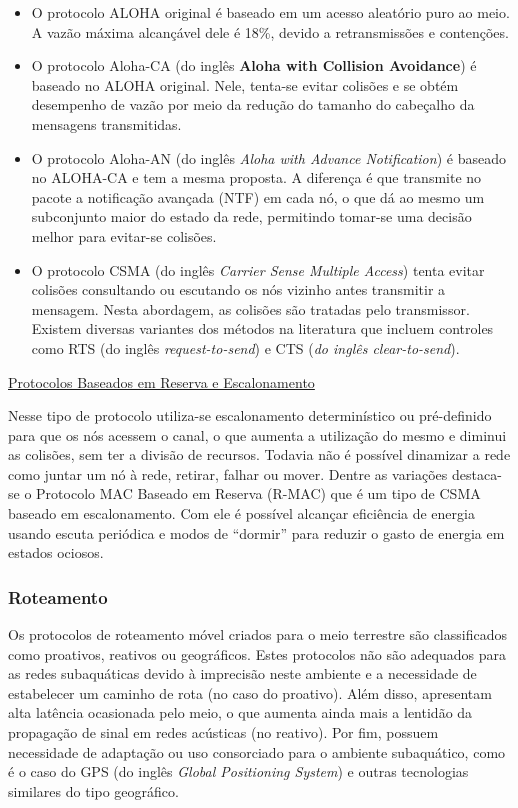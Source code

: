 \begin{itemize}
	\item O protocolo ALOHA original é baseado em um acesso aleatório puro ao meio. A vazão máxima alcançável dele é 18\%, devido a retransmissões e contenções.
	\item O protocolo Aloha-CA (do inglês \textbf{Aloha with Collision Avoidance}) é baseado no ALOHA original. Nele, tenta-se evitar colisões e se obtém desempenho de vazão por meio da redução do tamanho do cabeçalho da mensagens transmitidas.
	\item O protocolo Aloha-AN (do inglês \textit{Aloha with Advance Notification}) é baseado no ALOHA-CA e tem a mesma proposta. A diferença é que transmite no pacote a notificação avançada (NTF) em cada nó, o que dá ao mesmo um subconjunto maior do estado da rede, permitindo tomar-se uma decisão melhor para evitar-se colisões.
	\item O protocolo CSMA (do inglês \textit{Carrier Sense Multiple Access}) tenta evitar colisões consultando ou escutando os nós vizinho antes transmitir a mensagem. Nesta abordagem, as colisões são tratadas pelo transmissor. Existem diversas variantes dos métodos na literatura que incluem controles como RTS (do inglês \textit{request-to-send}) e CTS (\textit{do inglês clear-to-send}).
\end{itemize}

\underline{Protocolos Baseados em Reserva e Escalonamento}

Nesse tipo de protocolo utiliza-se escalonamento determinístico ou pré-definido para que os nós acessem o canal, o que aumenta a utilização do mesmo e diminui as colisões, sem ter a divisão de recursos. Todavia não é possível dinamizar a rede como juntar um nó à rede, retirar, falhar ou mover. Dentre as variações destaca-se o Protocolo MAC Baseado em Reserva (R-MAC) que é um tipo de CSMA baseado em escalonamento. Com ele é possível alcançar eficiência de energia usando escuta periódica e modos de ``dormir'' para reduzir o gasto de energia em estados ociosos.

\subsubsection*{Roteamento}

Os protocolos de roteamento móvel criados para o meio terrestre são classificados como proativos, reativos ou geográficos. Estes protocolos não são adequados para as redes subaquáticas devido à imprecisão neste ambiente e a necessidade de estabelecer um caminho de rota (no caso do proativo). Além disso, apresentam alta latência ocasionada pelo meio, o que aumenta ainda mais a lentidão da propagação de sinal em redes acústicas (no reativo). Por fim, possuem necessidade de adaptação ou uso consorciado para o ambiente subaquático, como é o caso do GPS (do inglês \textit{Global Positioning System}) e outras tecnologias similares do tipo geográfico. 

